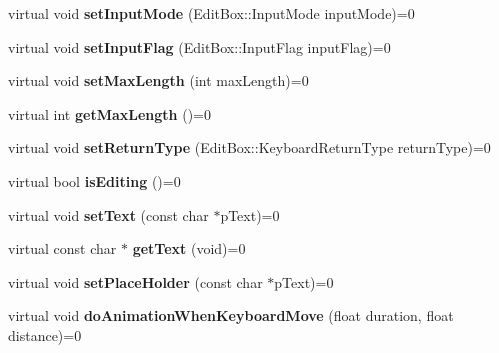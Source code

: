 \begin{DoxyCompactItemize}
virtual void {\bfseries set\+Input\+Mode} (Edit\+Box\+::\+Input\+Mode input\+Mode)=0
\item 
\mbox{\label{classcocos2d_1_1ui_1_1EditBoxImpl_a695ffdb8fb11a934c4df7f33a8d825cf}} 
virtual void {\bfseries set\+Input\+Flag} (Edit\+Box\+::\+Input\+Flag input\+Flag)=0
\item 
\mbox{\label{classcocos2d_1_1ui_1_1EditBoxImpl_a286be4fcc90d01033aeebc15f5721c01}} 
virtual void {\bfseries set\+Max\+Length} (int max\+Length)=0
\item 
\mbox{\label{classcocos2d_1_1ui_1_1EditBoxImpl_a8c3f9c93c0b14dedbed15e4dff599a92}} 
virtual int {\bfseries get\+Max\+Length} ()=0
\item 
\mbox{\label{classcocos2d_1_1ui_1_1EditBoxImpl_a80bc8e5897f7cc1e3dc04f493865d982}} 
virtual void {\bfseries set\+Return\+Type} (Edit\+Box\+::\+Keyboard\+Return\+Type return\+Type)=0
\item 
\mbox{\label{classcocos2d_1_1ui_1_1EditBoxImpl_a26ef2dc6715eb1a03704442e6b3710a4}} 
virtual bool {\bfseries is\+Editing} ()=0
\item 
\mbox{\label{classcocos2d_1_1ui_1_1EditBoxImpl_a57d39d247bf3e505338a4aa239f23ad5}} 
virtual void {\bfseries set\+Text} (const char $\ast$p\+Text)=0
\item 
\mbox{\label{classcocos2d_1_1ui_1_1EditBoxImpl_ad32c337f7bc9d292fd70931414354d70}} 
virtual const char $\ast$ {\bfseries get\+Text} (void)=0
\item 
\mbox{\label{classcocos2d_1_1ui_1_1EditBoxImpl_a82ba9a8b8a522951f5186e904a299947}} 
virtual void {\bfseries set\+Place\+Holder} (const char $\ast$p\+Text)=0
\item 
\mbox{\label{classcocos2d_1_1ui_1_1EditBoxImpl_a58ac88d8d8bdfd18d8cd39d452b31530}} 
virtual void {\bfseries do\+Animation\+When\+Keyboard\+Move} (float duration, float distance)=0

\end{DoxyCompactItemize}
